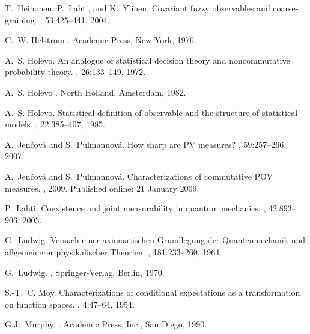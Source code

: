 \documentclass[12pt]{amsart}
\theoremstyle{definition}
\begin{document}
\begin{thebibliography}{HLY04}
T.~Heinonen, P.~Lahti, and K.~Ylinen.
\newblock Covariant fuzzy observables and coarse-graining.
, 53:425--441, 2004.

C.~W. Helstrom
.
\newblock Academic Press, New York, 1976.


A.~S. Holevo.
\newblock An analogue of statistical decision theory and noncommutative
  probability theory.
, 26:133--149, 1972.

A.~S. Holevo
.
\newblock North Holland, Amsterdam, 1982.

A.~S. Holevo.
\newblock Statistical definition of observable and the structure of statistical models.
, 22:385--407, 1985.

A.~Jen{\v{c}}ov{\'a} and S.~Pulmannov{\'a}.
\newblock How sharp are {PV} measures?
, 59:257--266, 2007.

A.~Jen{\v{c}}ov{\'a} and S.~Pulmannov{\'a}.
\newblock Characterizations of commutative {POV} measures.
, 2009.
\newblock Published online: 21 January 2009.

P.~Lahti.
\newblock Coexistence and joint measurability in quantum mechanics.
, 42:893--906, 2003.

G.~Ludwig.
\newblock Versuch einer axiomatischen Grundlegung der Quantenmechanik und
  allgemeinerer physikalischer Theorien.
, 181:233--260, 1964.

G.~Ludwig.
.
\newblock Springer-Verlag, Berlin, 1970.

S.-T.~C. Moy.
\newblock Characterizations of conditional expectations as a transformation on
  function spaces.
, 4:47--64, 1954.

G.J.~Murphy.
.
\newblock Academic Press, Inc., San Diego, 1990.


\end{thebibliography}
\end{document}
